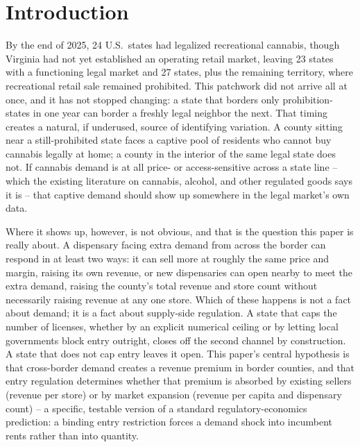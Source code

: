 \documentclass[12pt]{article}
\begin{document}
\section{Introduction}
\label{sec:intro}

By the end of 2025, 24 U.S.\ states had legalized recreational cannabis, though Virginia had not yet
established an operating retail market, leaving 23 states with a functioning legal market and 27 states,
plus the remaining territory, where recreational retail sale remained prohibited. This patchwork did not
arrive all at once, and it has not stopped changing: a state that borders only prohibition-states in one year
can border a freshly legal neighbor the next. That timing creates a natural, if underused, source of
identifying variation. A county sitting near a still-prohibited state faces a captive pool of residents who
cannot buy cannabis legally at home; a county in the interior of the same legal state does not. If cannabis
demand is at all price- or access-sensitive across a state line -- which the existing literature on cannabis,
alcohol, and other regulated goods says it is -- that captive demand should show up somewhere in the legal
market's own data.

Where it shows up, however, is not obvious, and that is the question this paper is really about. A dispensary
facing extra demand from across the border can respond in at least two ways: it can sell more at roughly the
same price and margin, raising its own revenue, or new dispensaries can open nearby to meet the extra demand,
raising the county's total revenue and store count without necessarily raising revenue at any one store. Which
of these happens is not a fact about demand; it is a fact about supply-side regulation. A state that caps the
number of licenses, whether by an explicit numerical ceiling or by letting local governments block entry
outright, closes off the second channel by construction. A state that does not cap entry leaves it open. This
paper's central hypothesis is that cross-border demand creates a revenue premium in border counties, and that
entry regulation determines whether that premium is absorbed by existing sellers (revenue per store) or by
market expansion (revenue per capita and dispensary count) -- a specific, testable version of a standard
regulatory-economics prediction: a binding entry restriction forces a demand shock into incumbent rents rather
than into quantity.
\end{document}

